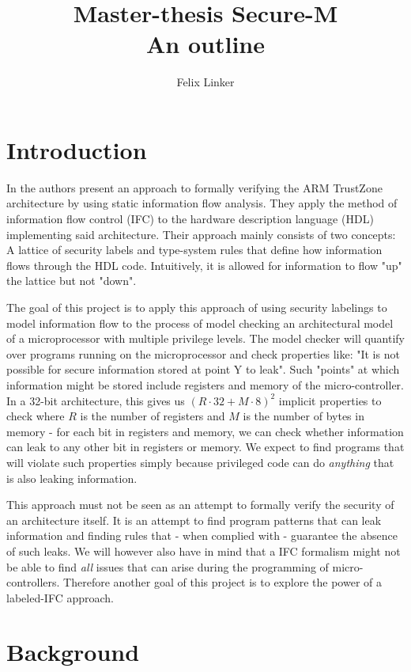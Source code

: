 \documentclass{article}
\title{Master-thesis Secure-M \\ \large{An outline}}
\author{Felix Linker}
\date{}
\begin{document}
\maketitle

\section{Introduction}

In \cite{Ferraiuolo17} the authors present an approach to formally verifying the ARM TrustZone architecture by using static information flow analysis.
They apply the method of information flow control (IFC) to the hardware description language (HDL) implementing said architecture.
Their approach mainly consists of two concepts: A lattice of security labels and type-system rules that define how information flows through the HDL code.
Intuitively, it is allowed for information to flow "up" the lattice but not "down".

The goal of this project is to apply this approach of using security labelings to model information flow to the process of model checking an architectural model of a microprocessor with multiple privilege levels.
The model checker will quantify over programs running on the microprocessor and check properties like: "It is not possible for secure information stored at point Y to leak".
Such "points" at which information might be stored include registers and memory of the micro-controller.
In a 32-bit architecture, this gives us $ (R \cdot 32 + M \cdot 8)^2 $ implicit properties to check where $ R $ is the number of registers and $ M $ is the number of bytes in memory - for each bit in registers and memory, we can check whether information can leak to any other bit in registers or memory.
We expect to find programs that will violate such properties simply because privileged code can do \textit{anything} that is also leaking information.

This approach must not be seen as an attempt to formally verify the security of an architecture itself.
It is an attempt to find program patterns that can leak information and finding rules that - when complied with - guarantee the absence of such leaks.
We will however also have in mind that a IFC formalism might not be able to find \textit{all} issues that can arise during the programming of micro-controllers.
Therefore another goal of this project is to explore the power of a labeled-IFC approach.

\section{Background}
\end{document}
